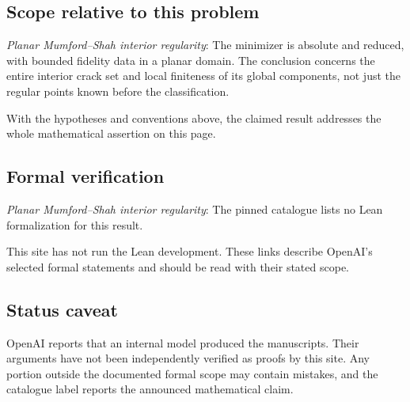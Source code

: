 \documentclass[11pt]{article}
\begin{document}
\subsection{Scope relative to this problem}
\textit{Planar Mumford--Shah interior regularity}: The minimizer is absolute and reduced, with bounded fidelity data in a planar domain. The conclusion concerns the entire interior crack set and local finiteness of its global components, not just the regular points known before the classification.

With the hypotheses and conventions above, the claimed result addresses the whole mathematical assertion on this page.

\subsection{Formal verification}
\textit{Planar Mumford--Shah interior regularity}: The pinned catalogue lists no Lean formalization for this result.

This site has not run the Lean development. These links describe OpenAI’s selected formal statements and should be read with their stated scope.

\subsection{Status caveat}
OpenAI reports that an internal model produced the manuscripts. Their arguments have not been independently verified as proofs by this site. Any portion outside the documented formal scope may contain mistakes, and the catalogue label reports the announced mathematical claim.
\end{document}
